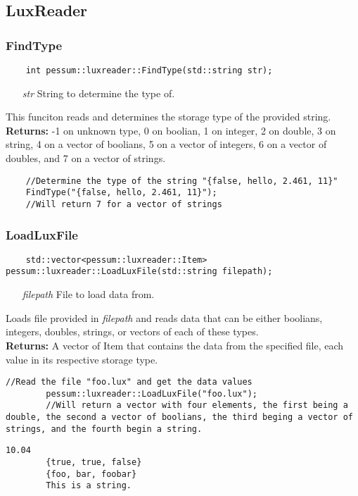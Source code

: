 \documentclass{subfiles}
\begin{document}
\subsection{LuxReader}
\newpage
\subsubsection{FindType}
\begin{lstlisting}
	int pessum::luxreader::FindType(std::string str);
\end{lstlisting}
\begin{enumerate}
	\item[\emph{str}] String to determine the type of.
\end{enumerate}
This funciton reads and determines the storage type of the provided string.\\
\textbf{Returns:} -1 on unknown type, 0 on boolian, 1 on integer, 2 on double, 3 on string, 4 on a vector of boolians, 5 on a vector of integers, 6 on a vector of doubles, and 7 on a vector of strings.
\begin{lstlisting}
	//Determine the type of the string "{false, hello, 2.461, 11}"
	FindType("{false, hello, 2.461, 11}");
	//Will return 7 for a vector of strings
\end{lstlisting}
\newpage
\subsubsection{LoadLuxFile}
\begin{lstlisting}
	std::vector<pessum::luxreader::Item> pessum::luxreader::LoadLuxFile(std::string filepath);
\end{lstlisting}
\begin{enumerate}
	\item[\emph{filepath}] File to load data from.
\end{enumerate}
Loads file provided in \emph{filepath} and reads data that can be either boolians, integers, doubles, strings, or vectors of each of these types.\\
\textbf{Returns:} A vector of Item that contains the data from the specified file, each value in its respective storage type.
\begin{lstlisting}[caption=code]
		//Read the file "foo.lux" and get the data values
		pessum::luxreader::LoadLuxFile("foo.lux");
		//Will return a vector with four elements, the first being a double, the second a vector of boolians, the third beging a vector of strings, and the fourth begin a string.
\end{lstlisting}
\begin{lstlisting}[caption="foo.lux"]
		10.04
		{true, true, false}
		{foo, bar, foobar}
		This is a string.
\end{lstlisting}
\end{document}
